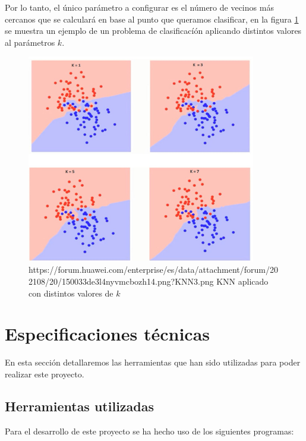             Por lo tanto, el único parámetro a configurar es el número de vecinos más cercanos que se calculará en base al punto que queramos clasificar, en la figura \ref{KNNImage} se muestra un ejemplo de un problema de clasificacíón aplicando distintos valores al parámetros $k$.

            \begin{figure}[h]
                \centering
                \includegraphics[width=10cm]{archivos/CNN/KNN/KNNImage}
                \caption{https://forum.huawei.com/enterprise/es/data/attachment/forum/202108/20/150033de3l4nyvmcbozh14.png?KNN3.png KNN aplicado con distintos valores de $k$}
                \label{KNNImage}
            \end{figure}

            

    \section{Especificaciones técnicas}

        En esta sección detallaremos las herramientas que han sido utilizadas para poder realizar este proyecto.


        \subsection{Herramientas utilizadas}
            Para el desarrollo de este proyecto se ha hecho uso de los siguientes programas:

